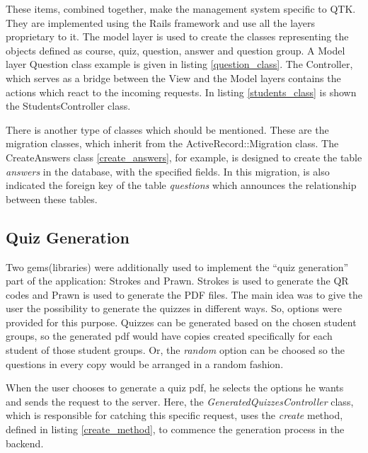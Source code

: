 These items, combined together, make the management system specific to QTK. They are implemented using the Rails framework and use all the layers proprietary to it. The model layer is used to create the classes representing the objects defined as course, quiz, question, answer and question group. A Model layer Question class example is given in listing \ref{question_class}.
The Controller, which serves as a bridge between the View and the Model layers contains the actions which react to the incoming requests. In listing \ref{students_class} is shown the StudentsController class. 

There is another type of classes which should be mentioned. These are the migration classes, which inherit from the ActiveRecord::Migration class. The CreateAnswers class \ref{create_answers}, for example, is designed to create the table \textit{answers} in the database, with the specified fields. In this migration, is also indicated the foreign key of the table \textit{questions} which announces the relationship between these tables.








\subsection{Quiz Generation}
Two gems(libraries) were additionally used to implement the ``quiz generation'' part of the application: Strokes and Prawn. Strokes is used to generate the QR codes and Prawn is used to generate the PDF files. The main idea was to give the user the possibility to generate the quizzes in different ways. So, options were provided for this purpose. Quizzes can be generated based on the chosen student groups, so the generated pdf would have copies created specifically for each student of those student groups. Or, the \textit{random} option can be choosed so the questions in every copy would be arranged in a random fashion.

When the user chooses to generate a quiz pdf, he selects the options he wants and sends the request to the server. Here, the \textit{GeneratedQuizzesController} class, which is responsible for catching this specific request, uses the \textit{create} method, defined in listing \ref{create_method}, to commence the generation process in the backend. 

